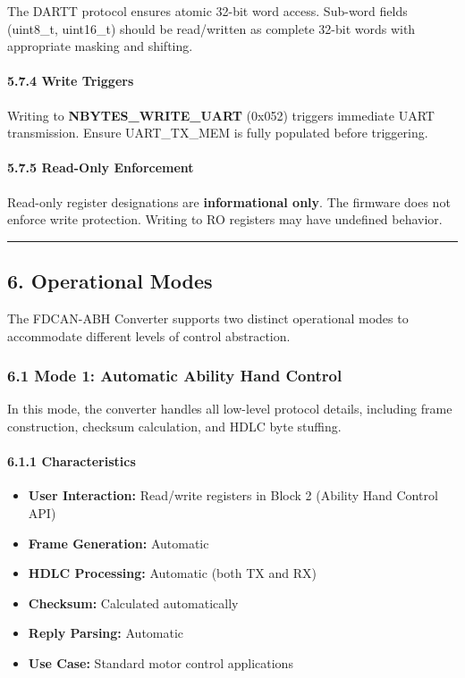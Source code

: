 \documentclass[
  11pt,
]{article}
\providecommand{\tightlist}{%
  \setlength{\itemsep}{0pt}\setlength{\parskip}{0pt}}
\begin{document}
The DARTT protocol ensures atomic 32-bit word access. Sub-word fields
(uint8\_t, uint16\_t) should be read/written as complete 32-bit words
with appropriate masking and shifting.

\paragraph{5.7.4 Write Triggers}\label{write-triggers}

Writing to \textbf{NBYTES\_WRITE\_UART} (0x052) triggers immediate UART
transmission. Ensure UART\_TX\_MEM is fully populated before triggering.

\paragraph{5.7.5 Read-Only Enforcement}\label{read-only-enforcement}

Read-only register designations are \textbf{informational only}. The
firmware does not enforce write protection. Writing to RO registers may
have undefined behavior.

\begin{center}\rule{0.5\linewidth}{0.5pt}\end{center}

\subsection{6. Operational Modes}\label{operational-modes}

The FDCAN-ABH Converter supports two distinct operational modes to
accommodate different levels of control abstraction.

\subsubsection{6.1 Mode 1: Automatic Ability Hand
Control}\label{mode-1-automatic-ability-hand-control}

In this mode, the converter handles all low-level protocol details,
including frame construction, checksum calculation, and HDLC byte
stuffing.

\paragraph{6.1.1 Characteristics}\label{characteristics}

\begin{itemize}
\tightlist
\item
  \textbf{User Interaction:} Read/write registers in Block 2 (Ability
  Hand Control API)
\item
  \textbf{Frame Generation:} Automatic
\item
  \textbf{HDLC Processing:} Automatic (both TX and RX)
\item
  \textbf{Checksum:} Calculated automatically
\item
  \textbf{Reply Parsing:} Automatic
\item
  \textbf{Use Case:} Standard motor control applications
\end{itemize}
\end{document}
